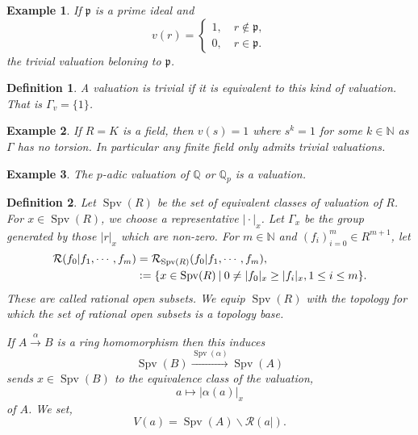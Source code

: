 \documentclass[8pt]{article}
\numberwithin{equation}{section}
\newtheorem{definition}{Definition}[subsection]
\newtheorem{example}{Example}[subsection]
\DeclareMathOperator{\Spv}{Spv}
\newcommand{\defeq}{\vcentcolon=}
\newcommand{\N}[0]{\mathbb{N}}
\newcommand{\Q}[0]{\mathbb{Q}}
\newcommand{\sep}[0]{\:|\:}
\newcommand{\p}[0]{\mathfrak{p}}
\begin{document}
\begin{example}
    If $\p$ is a prime ideal and 
    \begin{equation*}
        v(r) = \begin{cases}
            1,\quad r\not\in\p,\\
            0,\quad r\in\p.
        \end{cases}
    \end{equation*}
    the trivial valuation beloning to $\p$.
    \label{example_5_1}
\end{example}
\begin{definition}
    A valuation is trivial if it is equivalent to this kind of valuation. That is $\Gamma_v=\{1\}$.
\end{definition}
\begin{example}
    \label{example_5_2}
    If $R=K$ is a field, then $v(s) = 1$ where $s^k=1$ for some $k\in\N$ as $\Gamma$ has no torsion. In particular any finite field only admits trivial valuations. 
\end{example}
\begin{example}
    \label{example_5_3}
    The $p$-adic valuation of $\Q$ or $\Q_p$ is a valuation.
\end{example}
\begin{definition}
    \label{definition_5_5}
    Let $\Spv(R)$ be the set of equivalent classes of valuation of $R$. For $x\in\Spv(R)$, we choose a representative $\vert\cdot\vert_x$.
    Let $\Gamma_x$  be the group generated by those $\vert r\vert_x$ which are non-zero. For $m\in\N$ and $(f_i)_{i=0}^m\in R^{m+1}$, let 
    \begin{align*}
        \mathcal{R}(f_0|f_1,\cdots,f_m)& =\mathcal{R}_{\Spv(R)}(f_0|f_1,\cdots,f_m),\\
        &\defeq \{x\in\Spv(R)\sep 0\not=\vert f_0\vert_x\geq\vert f_i\vert_x, 1\leq i\leq m\}.
    \end{align*}
    These are called rational open subsets. We equip $\Spv(R)$ with the topology for which the set of rational open subsets is a topology base. 
    \par If $A\stackrel{\alpha}{\to}B$ is a ring homomorphism then this induces 
    \begin{equation*}
        \Spv(B)\stackrel{\Spv(\alpha)}{\to}\Spv(A)
    \end{equation*}
    sends $x\in\Spv(B)$ to the equivalence class of the valuation,
    \begin{equation*}
        a\mapsto\vert\alpha(a)\vert_x
    \end{equation*}
    of $A$. We set,
    \begin{equation*}
        V(a) = \Spv(A)\backslash \mathcal{R}(a|).
    \end{equation*}
\end{definition}
\end{document}
